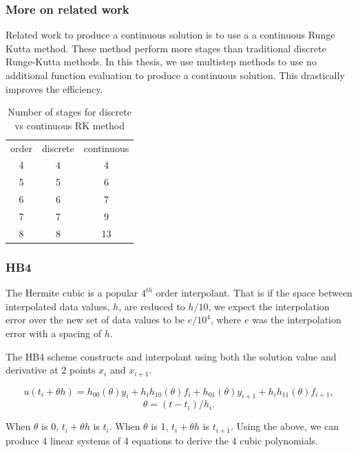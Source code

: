 \documentclass{beamer}
\begin{document}
\begin{frame}
\frametitle{More on related work}
Related work to produce a continuous solution is to use a a continuous Runge Kutta method. 
These method perform more stages than traditional discrete Runge-Kutta methods.
In this thesis, we use multistep methods to use no additional function evaluation to produce a continuous solution. This drastically improves the efficiency.
\begin{table}[h]
   \caption {Number of stages for discrete vs continuous RK method} 
   \label{tab:crk_nstages}
   \begin{center}
   \begin{tabular}{ c c c } 
   order   & discrete & continuous \\ 
   4 & 4  & 4  \\ 
   5 & 5  & 6  \\ 
   6 & 6  & 7  \\ 
   7 & 7  & 9  \\ 
   8 & 8  & 13 \\ 
   \end{tabular}
   \end{center}
   \end{table}
\end{frame}

\begin{frame}
\frametitle{HB4}
The Hermite cubic is a popular $4^{th}$ order interpolant.
That is if the space between interpolated data values, $h$, are reduced to $h/10$, we expect the interpolation error over the new set of data values to be $e/10^{4}$, where $e$ was the interpolation error with a spacing of $h$. 

The HB4 scheme constructs and interpolant using both the solution value and derivative at 2 points $x_i$ and $x_{i + 1}$.

\begin{equation}
\label{eqn:HB4}
u(t_i + \theta h) = h_{00}(\theta)y_i +  h_ih_{10}(\theta)f_i + h_{01}(\theta)y_{i + 1} + h_ih_{11}(\theta)f_{i + 1}, 
\end{equation}
\begin{equation}
\label{eqn:HB4_theta}
\theta = (t - t_i) / h_i.
\end{equation}

When $\theta$ is 0, $t_i + \theta h$ is $t_i$.
When $\theta$ is 1, $t_i + \theta h$ is $t_{i + 1}$.
Using the above, we can produce 4 linear systems of 4 equations to derive the 4 cubic polynomials.
\end{frame}
\end{document}
